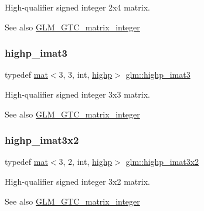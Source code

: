High-\/qualifier signed integer 2x4 matrix. \begin{DoxySeeAlso}{See also}
\mbox{\hyperlink{group__gtc__matrix__integer}{G\+L\+M\+\_\+\+G\+T\+C\+\_\+matrix\+\_\+integer}} 
\end{DoxySeeAlso}
\mbox{\label{group__gtc__matrix__integer_ga3a8088cb8c764ec1c3719f31b3687ba8}} 
\subsubsection{\texorpdfstring{highp\+\_\+imat3}{highp\_imat3}}
{\footnotesize\ttfamily typedef \mbox{\hyperlink{structglm_1_1mat}{mat}}$<$3, 3, int, \mbox{\hyperlink{namespaceglm_a36ed105b07c7746804d7fdc7cc90ff25ac6f7eab42eacbb10d59a58e95e362074}{highp}}$>$ \mbox{\hyperlink{group__gtc__matrix__integer_ga3a8088cb8c764ec1c3719f31b3687ba8}{glm\+::highp\+\_\+imat3}}}

High-\/qualifier signed integer 3x3 matrix. \begin{DoxySeeAlso}{See also}
\mbox{\hyperlink{group__gtc__matrix__integer}{G\+L\+M\+\_\+\+G\+T\+C\+\_\+matrix\+\_\+integer}} 
\end{DoxySeeAlso}
\mbox{\label{group__gtc__matrix__integer_gaf5097ad25b9a991ad010aba6736b333e}} 
\subsubsection{\texorpdfstring{highp\+\_\+imat3x2}{highp\_imat3x2}}
{\footnotesize\ttfamily typedef \mbox{\hyperlink{structglm_1_1mat}{mat}}$<$3, 2, int, \mbox{\hyperlink{namespaceglm_a36ed105b07c7746804d7fdc7cc90ff25ac6f7eab42eacbb10d59a58e95e362074}{highp}}$>$ \mbox{\hyperlink{group__gtc__matrix__integer_gaf5097ad25b9a991ad010aba6736b333e}{glm\+::highp\+\_\+imat3x2}}}

High-\/qualifier signed integer 3x2 matrix. \begin{DoxySeeAlso}{See also}
\mbox{\hyperlink{group__gtc__matrix__integer}{G\+L\+M\+\_\+\+G\+T\+C\+\_\+matrix\+\_\+integer}} 
\end{DoxySeeAlso}
\mbox{\label{group__gtc__matrix__integer_ga56dfcd09960c88895e72cbdcddc08ae6}} 
